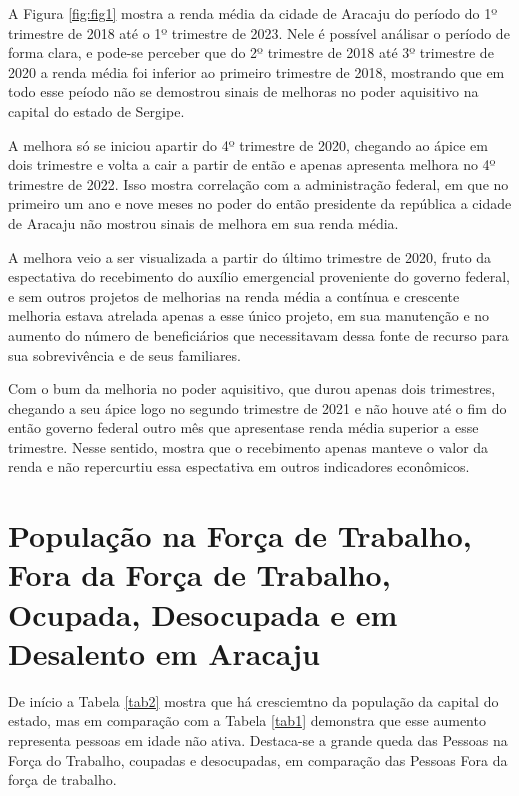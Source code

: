 \documentclass[
  12pt,
  a4paper,
]{article}
\begin{document}
A Figura \ref{fig:fig1} mostra a renda média da cidade de Aracaju do
período do 1º trimestre de 2018 até o 1º trimestre de 2023. Nele é
possível análisar o período de forma clara, e pode-se perceber que do 2º
trimestre de 2018 até 3º trimestre de 2020 a renda média foi inferior ao
primeiro trimestre de 2018, mostrando que em todo esse peíodo não se
demostrou sinais de melhoras no poder aquisitivo na capital do estado de
Sergipe.

A melhora só se iniciou apartir do 4º trimestre de 2020, chegando ao
ápice em dois trimestre e volta a cair a partir de então e apenas
apresenta melhora no 4º trimestre de 2022. Isso mostra correlação com a
administração federal, em que no primeiro um ano e nove meses no poder
do então presidente da república a cidade de Aracaju não mostrou sinais
de melhora em sua renda média.

A melhora veio a ser visualizada a partir do último trimestre de 2020,
fruto da espectativa do recebimento do auxílio emergencial proveniente
do governo federal, e sem outros projetos de melhorias na renda média a
contínua e crescente melhoria estava atrelada apenas a esse único
projeto, em sua manutenção e no aumento do número de beneficiários que
necessitavam dessa fonte de recurso para sua sobrevivência e de seus
familiares.

Com o bum da melhoria no poder aquisitivo, que durou apenas dois
trimestres, chegando a seu ápice logo no segundo trimestre de 2021 e não
houve até o fim do então governo federal outro mês que apresentase renda
média superior a esse trimestre. Nesse sentido, mostra que o recebimento
apenas manteve o valor da renda e não repercurtiu essa espectativa em
outros indicadores econômicos.

\hypertarget{populauxe7uxe3o-na-foruxe7a-de-trabalho-fora-da-foruxe7a-de-trabalho-ocupada-desocupada-e-em-desalento-em-aracaju}{%
\section{População na Força de Trabalho, Fora da Força de Trabalho,
Ocupada, Desocupada e em Desalento em
Aracaju}\label{populauxe7uxe3o-na-foruxe7a-de-trabalho-fora-da-foruxe7a-de-trabalho-ocupada-desocupada-e-em-desalento-em-aracaju}}

De início a Tabela \ref{tab2} mostra que há cresciemtno da população da
capital do estado, mas em comparação com a Tabela \ref{tab1} demonstra
que esse aumento representa pessoas em idade não ativa. Destaca-se a
grande queda das Pessoas na Força do Trabalho, coupadas e desocupadas,
em comparação das Pessoas Fora da força de trabalho.
\end{document}
